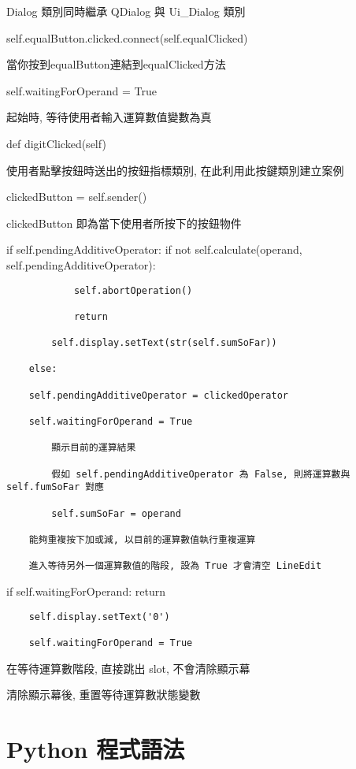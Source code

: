 \documentclass[12pt,,]{report}
\begin{document}
Dialog 類別同時繼承 QDialog 與 Ui\_Dialog 類別

self.equalButton.clicked.connect(self.equalClicked)

當你按到equalButton連結到equalClicked方法

self.waitingForOperand = True

起始時, 等待使用者輸入運算數值變數為真

def digitClicked(self)

使用者點擊按鈕時送出的按鈕指標類別, 在此利用此按鍵類別建立案例

clickedButton = self.sender()

clickedButton 即為當下使用者所按下的按鈕物件

if self.pendingAdditiveOperator: if not self.calculate(operand,
self.pendingAdditiveOperator):

\begin{verbatim}
            self.abortOperation()
            
            return
            
        self.display.setText(str(self.sumSoFar))
        
    else:

    self.pendingAdditiveOperator = clickedOperator
   
    self.waitingForOperand = True

        顯示目前的運算結果
        
        假如 self.pendingAdditiveOperator 為 False, 則將運算數與 self.fumSoFar 對應
        
        self.sumSoFar = operand
        
    能夠重複按下加或減, 以目前的運算數值執行重複運算
  
    進入等待另外一個運算數值的階段, 設為 True 才會清空 LineEdit
\end{verbatim}

if self.waitingForOperand: return

\begin{verbatim}
    self.display.setText('0')
    
    self.waitingForOperand = True
\end{verbatim}

在等待運算數階段, 直接跳出 slot, 不會清除顯示幕

清除顯示幕後, 重置等待運算數狀態變數

\hypertarget{python-ux7a0bux5f0fux8a9eux6cd5}{%
\chapter{Python 程式語法}\label{python-ux7a0bux5f0fux8a9eux6cd5}}
\end{document}
